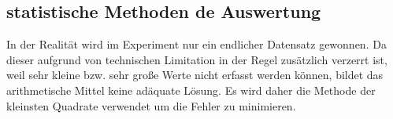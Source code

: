\subsection{statistische Methoden de Auswertung}
In der Realität wird im Experiment nur ein endlicher Datensatz gewonnen. Da dieser aufgrund von technischen Limitation in der Regel zusätzlich verzerrt ist, weil sehr kleine bzw. sehr große Werte nicht erfasst werden können, bildet das arithmetische Mittel keine adäquate Lösung. Es wird daher die Methode der kleinsten Quadrate verwendet um die Fehler zu minimieren.